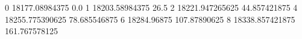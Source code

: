 0 18177.08984375 0.0
1 18203.58984375 26.5
2 18221.947265625 44.857421875
4 18255.775390625 78.685546875
6 18284.96875 107.87890625
8 18338.857421875 161.767578125
